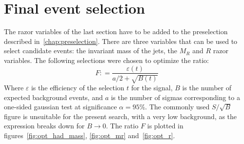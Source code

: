 \section{Final event selection}
The razor variables of the last section have to be added to the preselection
described in~\ref{chap:preselection}. There are three variables that can be
used to select candidate \TP events: the invariant mass of the jets, the
$M_R$ and $R$ razor variables. The following selections were chosen to
optimize the ratio\cite{punzi}:
\begin{equation*}
    F \mathop: = \dfrac{\varepsilon(t)}{a/2 + \sqrt{B(t)}}
\end{equation*}
Where $\varepsilon$ is the efficiency of the selection $t$ for the signal,
$B$ is the number of expected background events, and $a$ is the number of
sigmas corresponding to a one-sided gaussian test at significance $\alpha =
95\%$.
The commonly used $S/\sqrt{B}$ figure is unsuitable for the present search,
with a very low background, as the expression breaks down for $B\rightarrow
0$. The ratio $F$ is plotted in figures~\ref{fig:opt_had_mass},
\ref{fig:opt_mr} and~\ref{fig:opt_r}.

